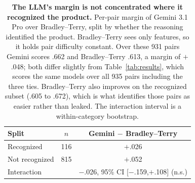 \begin{table}[t]
\centering
\footnotesize
\setlength{\tabcolsep}{6pt}
\renewcommand{\arraystretch}{0.95}
\caption{\textbf{The LLM's margin is not concentrated where it recognized the
product.} Per-pair margin of Gemini 3.1 Pro over Bradley--Terry, split by whether the
reasoning identified the product. Bradley--Terry sees only features, so it holds pair
difficulty constant. Over these 931 pairs Gemini scores .662 and
Bradley--Terry .613, a margin of $+$.048; both differ slightly
from Table~\ref{tab:results}, which scores the same models over all 935 pairs
including the three ties. Bradley--Terry also improves on the recognized subset
(.605 to .672), which is what identifies those pairs as easier rather
than leaked. The interaction interval is a within-category bootstrap.}
\label{tab:recognition-margin}
\begin{tabular}{@{}lcc@{}}
\toprule
Split & $n$ & Gemini $-$ Bradley--Terry \\
\midrule
Recognized & 116 & $+$.026 \\
Not recognized & 815 & $+$.052 \\
\midrule
Interaction & & $-$.026, 95\% CI [$-$.159,$+$.108] (n.s.) \\
\bottomrule
\end{tabular}
\end{table}
